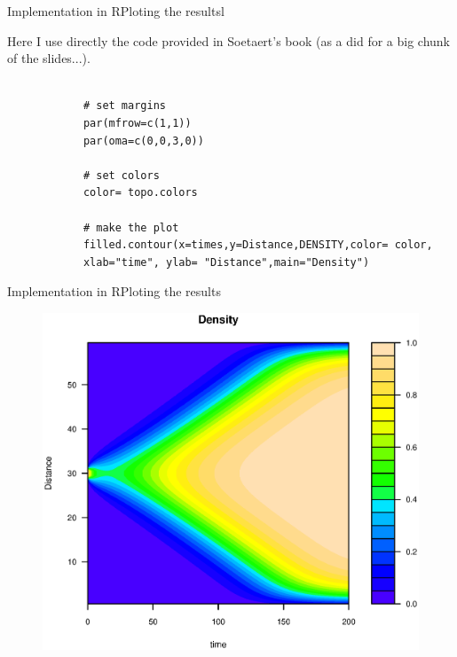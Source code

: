 \documentclass{eecslides}
\begin{document}
	
	\begin{frame}[fragile]{Implementation in R}{Ploting the resultsl}
	
	Here I use directly the code provided in Soetaert's book (as a did for a big chunk of the slides...).\\
		\begin{lstlisting}
		
			# set margins
			par(mfrow=c(1,1))
			par(oma=c(0,0,3,0))   

			# set colors
			color= topo.colors

			# make the plot
			filled.contour(x=times,y=Distance,DENSITY,color= color,
			xlab="time", ylab= "Distance",main="Density")

		\end{lstlisting}

	\end{frame}

	
	\begin{frame}[fragile]{Implementation in R}{Ploting the results}

		\begin{figure}[!t]
			\includegraphics[height=0.75\textheight]{diffusion_reaction}
		\end{figure}

	\end{frame}
\end{document}
